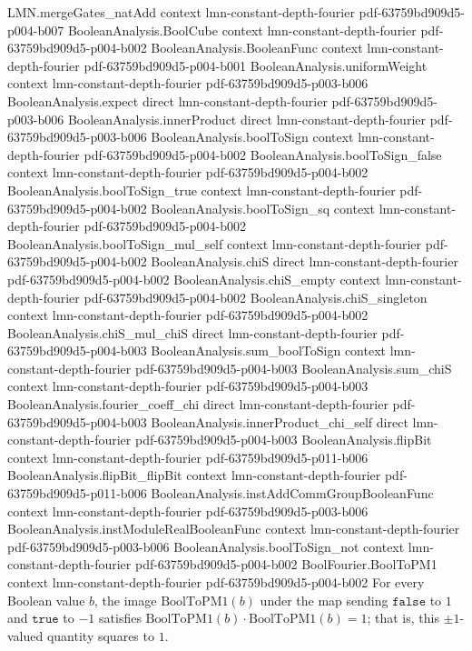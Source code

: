 \begin{lemma}
  {LMN.mergeGates_natAdd}
  {context}
  {lmn-constant-depth-fourier}
  {pdf-63759bd909d5-p004-b007}
\proofstep
  {BooleanAnalysis.BoolCube}
  {context}
  {lmn-constant-depth-fourier}
  {pdf-63759bd909d5-p004-b002}
\proofstep
  {BooleanAnalysis.BooleanFunc}
  {context}
  {lmn-constant-depth-fourier}
  {pdf-63759bd909d5-p004-b001}
\proofstep
  {BooleanAnalysis.uniformWeight}
  {context}
  {lmn-constant-depth-fourier}
  {pdf-63759bd909d5-p003-b006}
\proofstep
  {BooleanAnalysis.expect}
  {direct}
  {lmn-constant-depth-fourier}
  {pdf-63759bd909d5-p003-b006}
\proofstep
  {BooleanAnalysis.innerProduct}
  {direct}
  {lmn-constant-depth-fourier}
  {pdf-63759bd909d5-p003-b006}
\proofstep
  {BooleanAnalysis.boolToSign}
  {context}
  {lmn-constant-depth-fourier}
  {pdf-63759bd909d5-p004-b002}
\proofstep
  {BooleanAnalysis.boolToSign_false}
  {context}
  {lmn-constant-depth-fourier}
  {pdf-63759bd909d5-p004-b002}
\proofstep
  {BooleanAnalysis.boolToSign_true}
  {context}
  {lmn-constant-depth-fourier}
  {pdf-63759bd909d5-p004-b002}
\proofstep
  {BooleanAnalysis.boolToSign_sq}
  {context}
  {lmn-constant-depth-fourier}
  {pdf-63759bd909d5-p004-b002}
\proofstep
  {BooleanAnalysis.boolToSign_mul_self}
  {context}
  {lmn-constant-depth-fourier}
  {pdf-63759bd909d5-p004-b002}
\proofstep
  {BooleanAnalysis.chiS}
  {direct}
  {lmn-constant-depth-fourier}
  {pdf-63759bd909d5-p004-b002}
\proofstep
  {BooleanAnalysis.chiS_empty}
  {context}
  {lmn-constant-depth-fourier}
  {pdf-63759bd909d5-p004-b002}
\proofstep
  {BooleanAnalysis.chiS_singleton}
  {context}
  {lmn-constant-depth-fourier}
  {pdf-63759bd909d5-p004-b002}
\proofstep
  {BooleanAnalysis.chiS_mul_chiS}
  {direct}
  {lmn-constant-depth-fourier}
  {pdf-63759bd909d5-p004-b003}
\proofstep
  {BooleanAnalysis.sum_boolToSign}
  {context}
  {lmn-constant-depth-fourier}
  {pdf-63759bd909d5-p004-b003}
\proofstep
  {BooleanAnalysis.sum_chiS}
  {context}
  {lmn-constant-depth-fourier}
  {pdf-63759bd909d5-p004-b003}
\proofstep
  {BooleanAnalysis.fourier_coeff_chi}
  {direct}
  {lmn-constant-depth-fourier}
  {pdf-63759bd909d5-p004-b003}
\proofstep
  {BooleanAnalysis.innerProduct_chi_self}
  {direct}
  {lmn-constant-depth-fourier}
  {pdf-63759bd909d5-p004-b003}
\proofstep
  {BooleanAnalysis.flipBit}
  {context}
  {lmn-constant-depth-fourier}
  {pdf-63759bd909d5-p011-b006}
\proofstep
  {BooleanAnalysis.flipBit_flipBit}
  {context}
  {lmn-constant-depth-fourier}
  {pdf-63759bd909d5-p011-b006}
\proofstep
  {BooleanAnalysis.instAddCommGroupBooleanFunc}
  {context}
  {lmn-constant-depth-fourier}
  {pdf-63759bd909d5-p003-b006}
\proofstep
  {BooleanAnalysis.instModuleRealBooleanFunc}
  {context}
  {lmn-constant-depth-fourier}
  {pdf-63759bd909d5-p003-b006}
\proofstep
  {BooleanAnalysis.boolToSign_not}
  {context}
  {lmn-constant-depth-fourier}
  {pdf-63759bd909d5-p004-b002}
\proofstep
  {BoolFourier.BoolToPM1}
  {context}
  {lmn-constant-depth-fourier}
  {pdf-63759bd909d5-p004-b002}
For every Boolean value $b$, the image $\mathrm{BoolToPM1}(b)$ under the map sending
$\mathtt{false}$ to $1$ and $\mathtt{true}$ to $-1$ satisfies
$\mathrm{BoolToPM1}(b)\cdot\mathrm{BoolToPM1}(b) = 1$; that is, this $\pm 1$-valued
quantity squares to $1$.
\end{lemma}

